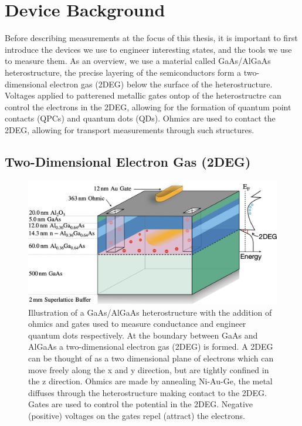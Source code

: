 \chapter{Device Background}\label{cha:device_background}

Before describing measurements at the focus of this thesis, it is important to first introduce the devices we use to engineer interesting states, and the tools we use to measure them. As an overview, we use a material called GaAs/AlGaAs heterostructure, the precise layering of the semiconductors form a two-dimensional electron gas (2DEG) below the surface of the heterostructure. Voltages applied to patterened metallic gates ontop of the heterostructre can control the electrons in the 2DEG, allowing for the formation of quantum point contacts (QPCs) and quantum dots  (QDs). Ohmics are used to contact the 2DEG, allowing for transport measurements through such structures. 

\section{Two-Dimensional Electron Gas (2DEG)}



\begin{figure}[!htb]
  \begin{center}
    \includegraphics[width=1.0\textwidth]{figures/ch1/crop_FiguresMaster.002.png}
    \caption[Two-dimensional electron gas in a GaAs/AlGaAs heterostructure]{\label{fig:ch1/2deg} 
    Illustration of a GaAs/AlGaAs heterostructure with the addition of ohmics and gates used to measure conductance and engineer quantum dots respectively. At the boundary between GaAs and AlGaAs a two-dimensional electron gas (2DEG) is formed. A 2DEG can be thought of as a two dimensional plane of electrons which can move freely along the x and y direction, but are tightly confined in the z direction. Ohmics are made by annealing Ni-Au-Ge, the metal diffuses through the heterostructure making contact to the 2DEG. Gates are used to control the potential in the 2DEG. Negative (positive) voltages on the gates repel (attract) the electrons.
      }
  \end{center}
\end{figure}




